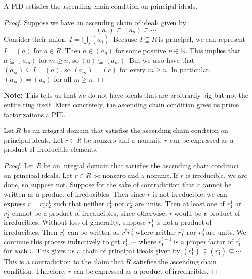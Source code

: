 \documentclass [12pt] {article}
\newcommand{\N}{\mathbb{N}}
\newenvironment{theorem}[1]{\begin{tcolorbox}[title={Theorem #1},colback=green!5!white,colframe=black!75!green]}{\end{tcolorbox}}
\renewcommand{\bf}[1]{\textbf{{#1}}}
\begin{document}
\begin{theorem}{}
    A PID satisfies the ascending chain condition on principal ideals.
\end{theorem}
\begin{proof}
    Suppose we have an ascending chain of ideals given by
    \[(a_1) \subseteq (a_2) \subseteq \cdots\]
    Consider their union, $I = \bigcup_j (a_j)$. Because $I \subseteq R$ is principal, we can
    represent $I = (a)$ for $a \in R$. Then $a \in (a_n)$ for some positive $n \in \N$. This implies
    that $a \subseteq (a_m)$ for $m \geq n$, so $(a) \subseteq (a_m)$. But we also have that
    $(a_m) \subseteq I = (a)$, so $(a_m) = (a)$ for every $m \geq n$. In particular, $(a_m) = (a_n)$
    for all $m \geq n$.
\end{proof}
\bf{Note:} This tells us that we do not have ideals that are arbitrarily big but not the entire ring
itself. More concretely, the ascending chain condition gives us prime factorizations a PID.

\begin{theorem}{}
    Let $R$ be an integral domain that satisfies the ascending chain condition on principal ideals.
    Let $r \in R$ be nonzero and a nonunit. $r$ can be expressed as a product of irreducible
    elements.
\end{theorem}
\begin{proof}
    Let $R$ be an integral domain that satisfies the ascending chain condition on principal ideals.
    Let $r \in R$ be nonzero and a nonunit. If $r$ is irreducible, we are done, so suppose not.
    Suppose for the sake of contradiciton that $r$ cannot be written as a product of
    irreducibles. Then since $r$ is not irreducible, we can express $r = r_1^1 r_2^1$ such that
    neither $r_1^1$ nor $r_2^1$ are units. Then at least one of $r_1^1$ or $r_2^1$ cannot be a
    product of irreducibles, since otherwise, $r$ would be a product of irreducibles. Without loss
    of generality, suppose $r_1^1$ is not a product of irreducibles. Then $r_1^1$ can be written as
    $r_1^2 r_2^2$ where neither $r_1^2$ nor $r_2^2$ are units. We continue this process inductively
    to get $r_1^1, \cdots$ where $r_1^{i + 1}$ is a proper factor of $r_1^i$ for each $i$. This
    gives us a chain  of principal ideals given by $(r_1^1) \subsetneq (r_1^2) \subsetneq \cdots$.
    This is a contradiction to the claim that $R$ satisfies the ascending chain condition.
    Therefore, $r$ can be expressed as a product of irreducibles.
\end{proof}
\end{document}
